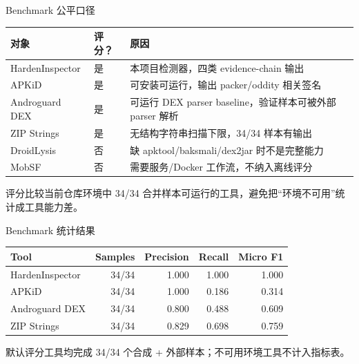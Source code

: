 \documentclass[10pt,aspectratio=169]{beamer}
\begin{document}
\begin{frame}{Benchmark 公平口径}
  \scriptsize
  \begin{table}
    \centering
    \begin{tabular}{p{2.25cm}p{1.55cm}p{7.55cm}}
      \toprule
      对象 & 评分？ & 原因 \\
      \midrule
      HardenInspector & 是 & 本项目检测器，四类 evidence-chain 输出 \\
      APKiD & 是 & 可安装可运行，输出 packer/oddity 相关签名 \\
      Androguard DEX & 是 & 可运行 DEX parser baseline，验证样本可被外部 parser 解析 \\
      ZIP Strings & 是 & 无结构字符串扫描下限，34/34 样本有输出 \\
      DroidLysis & 否 & 缺 apktool/baksmali/dex2jar 时不是完整能力 \\
      MobSF & 否 & 需要服务/Docker 工作流，不纳入离线评分 \\
      \bottomrule
    \end{tabular}
  \end{table}
  评分比较当前仓库环境中 34/34 合并样本可运行的工具，避免把“环境不可用”统计成工具能力差。
\end{frame}

\begin{frame}{Benchmark 统计结果}
  \small
  \begin{table}
    \centering
    \begin{tabular}{lrrrr}
      \toprule
      Tool & Samples & Precision & Recall & Micro F1 \\
      \midrule
      HardenInspector & 34/34 & 1.000 & 1.000 & 1.000 \\
      APKiD & 34/34 & 1.000 & 0.186 & 0.314 \\
      Androguard DEX & 34/34 & 0.800 & 0.488 & 0.609 \\
      ZIP Strings & 34/34 & 0.829 & 0.698 & 0.759 \\
      \bottomrule
    \end{tabular}
  \end{table}
  \vspace{0.35em}
  默认评分工具均完成 34/34 个合成 + 外部样本；不可用环境工具不计入指标表。
\end{frame}
\end{document}
